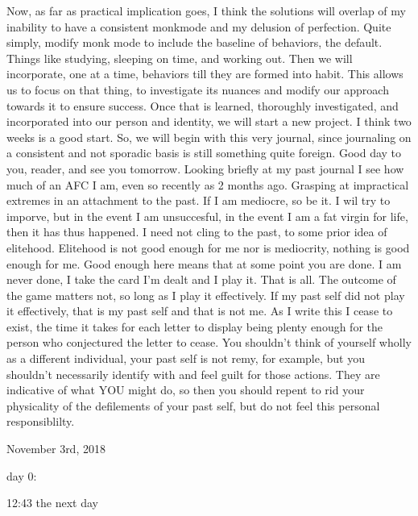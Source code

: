 \qquad Now, as far as practical implication goes, I think the solutions
will overlap of my inability to have a consistent monkmode and my
delusion of perfection. Quite simply, modify monk mode to include the
baseline of behaviors, the default. Things like studying, sleeping on
time, and working out. Then we will incorporate, one at a time,
behaviors till they are formed into habit. This allows us to focus on
that thing, to investigate its nuances and modify our approach towards
it to ensure success. Once that is learned, thoroughly investigated, and
incorporated into our person and identity, we will start a new project.
I think two weeks is a good start. So, we will begin with this very
journal, since journaling on a consistent and not sporadic basis is
still something quite foreign. Good day to you, reader, and see you
tomorrow. Looking briefly at my past journal I see how much of an AFC I
am, even so recently as 2 months ago. Grasping at impractical extremes
in an attachment to the past. If I am mediocre, so be it. I wil try to
imporve, but in the event I am unsuccesful, in the event I am a fat
virgin for life, then it has thus happened. I need not cling to the
past, to some prior idea of elitehood. Elitehood is not good enough for
me nor is mediocrity, nothing is good enough for me. Good enough here
means that at some point you are done. I am never done, I take the card
I'm dealt and I play it. That is all. The outcome of the game matters
not, so long as I play it effectively. If my past self did not play it
effectively, that is my past self and that is not me. As I write this I
cease to exist, the time it takes for each letter to display being
plenty enough for the person who conjectured the letter to cease. You
shouldn't think of yourself wholly as a different individual, your past
self is not remy, for example, but you shouldn't necessarily identify
with and feel guilt for those actions. They are indicative of what YOU
might do, so then you should repent to rid your physicality of the
defilements of your past self, but do not feel this personal
responsiblilty.

\bigskip
\bigskip
November 3rd, 2018

day 0:

12:43 the next day


